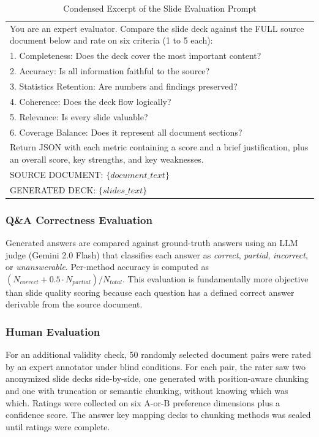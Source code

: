 \documentclass{ieeeaccess}
\begin{document}
\begin{table}[h]
\caption{Condensed Excerpt of the Slide Evaluation Prompt}
\label{tab:eval-prompt}
\centering
\footnotesize
\begin{tabular}{|p{}|}
\hline
You are an expert evaluator. Compare the slide deck against the FULL source document below and rate on six criteria (1 to 5 each): \\
1. Completeness: Does the deck cover the most important content? \\
2. Accuracy: Is all information faithful to the source? \\
3. Statistics Retention: Are numbers and findings preserved? \\
4. Coherence: Does the deck flow logically? \\
5. Relevance: Is every slide valuable? \\
6. Coverage Balance: Does it represent all document sections? \\
Return JSON with each metric containing a score and a brief justification, plus an overall score, key strengths, and key weaknesses. \\
SOURCE DOCUMENT: $\{document\_text\}$ \\
GENERATED DECK: $\{slides\_text\}$ \\
\hline
\end{tabular}
\end{table}

\subsubsection{Q\&A Correctness Evaluation}

Generated answers are compared against ground-truth answers using an LLM judge (Gemini 2.0 Flash) that classifies each answer as \emph{correct}, \emph{partial}, \emph{incorrect}, or \emph{unanswerable}. Per-method accuracy is computed as $(N_{correct} + 0.5 \cdot N_{partial}) / N_{total}$. This evaluation is fundamentally more objective than slide quality scoring because each question has a defined correct answer derivable from the source document.

\subsubsection{Human Evaluation}

For an additional validity check, 50 randomly selected document pairs were rated by an expert annotator under blind conditions. For each pair, the rater saw two anonymized slide decks side-by-side, one generated with position-aware chunking and one with truncation or semantic chunking, without knowing which was which. Ratings were collected on six A-or-B preference dimensions plus a confidence score. The answer key mapping decks to chunking methods was sealed until ratings were complete.
\end{document}
